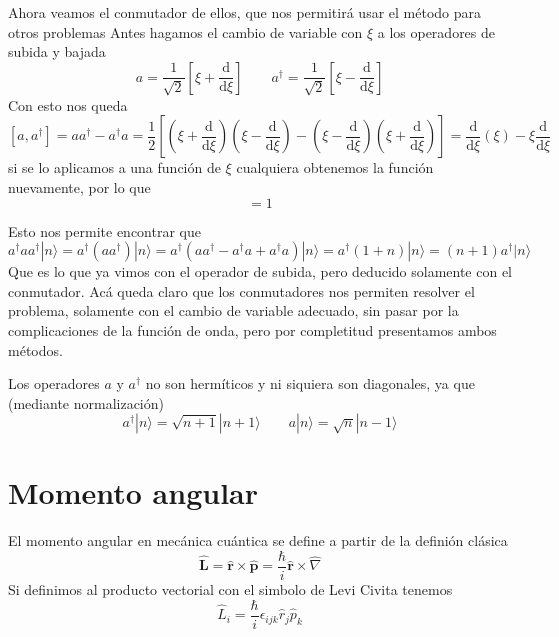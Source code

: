 Ahora veamos el conmutador de ellos, que nos permitirá usar el método para otros problemas
Antes hagamos el cambio de variable con $\xi$ a los operadores de subida y bajada
\begin{equation}
    a = \frac{1}{\sqrt{2}} \left[ \xi + \frac{\mathrm{d}}{\mathrm{d}\xi} \right] \qquad a^{\dagger} = \frac{1}{\sqrt{2}} \left[ \xi - \frac{\mathrm{d}}{\mathrm{d}\xi}\right]
\end{equation}
Con esto nos queda
\[ [a,a^\dagger] = a a^\dagger - a^\dagger a = \frac{1}{2} \left[ \left(\xi + \frac{\mathrm{d}}{\mathrm{d}\xi} \right) \left(\xi - \frac{\mathrm{d}}{\mathrm{d}\xi} \right) - \left(\xi - \frac{\mathrm{d}}{\mathrm{d}\xi}\right) \left( \xi + \frac{\mathrm{d}}{\mathrm{d}\xi} \right)\right] = \frac{\mathrm{d}}{\mathrm{d}\xi} (\xi) - \xi \frac{\mathrm{d}}{\mathrm{d}\xi}\]
si se lo aplicamos a una función de $\xi$ cualquiera obtenemos la función nuevamente, por lo que
\begin{equation}
    [a, a^{\dagger}] = 1
\end{equation}

Esto nos permite encontrar que
\[ a^\dagger a a^\dagger |n\rangle =  a^\dagger (a a^\dagger) |n \rangle = a^\dagger (a a^\dagger - a^\dagger a + a^\dagger a) |n \rangle = a^\dagger (1 + n) |n\rangle = (n + 1) a^\dagger |n\rangle\]
Que es lo que ya vimos con el operador de subida, pero deducido solamente con el conmutador.
Acá queda claro que los conmutadores nos permiten resolver el problema, solamente con el cambio de variable adecuado, sin pasar por la complicaciones de la función de onda, pero por completitud presentamos ambos métodos.

Los operadores $a$ y $a^\dagger$ no son hermíticos y ni siquiera son diagonales, ya que (mediante normalización)
\begin{equation}
    a^\dagger |n \rangle = \sqrt{n + 1} |n + 1\rangle \qquad a|n\rangle = \sqrt{n} |n - 1\rangle
\end{equation}

\section{Momento angular}

El momento angular en mecánica cuántica se define a partir de la definión clásica
\begin{equation}
    \hat{\boldsymbol{L}} = \hat{\boldsymbol{r}} \times \hat{\boldsymbol{p}} = \frac{\hbar}{i} \hat{\boldsymbol{r}} \times \hat{\nabla}
    \label{eq:momento_angular_def}
\end{equation}
Si definimos al producto vectorial con el simbolo de Levi Civita tenemos
\begin{equation}
    \hat{L}_i = \frac{\hbar}{i} \epsilon_{i j k}  \hat{r}_j \hat{p}_k
\end{equation}

